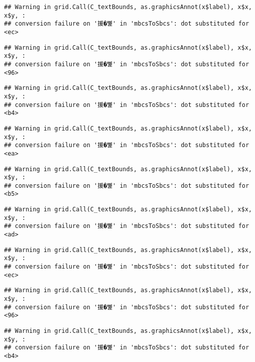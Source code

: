 \documentclass[
]{article}
\begin{document}
\begin{verbatim}
## Warning in grid.Call(C_textBounds, as.graphicsAnnot(x$label), x$x, x$y, :
## conversion failure on '援�뼱' in 'mbcsToSbcs': dot substituted for <ec>
\end{verbatim}

\begin{verbatim}
## Warning in grid.Call(C_textBounds, as.graphicsAnnot(x$label), x$x, x$y, :
## conversion failure on '援�뼱' in 'mbcsToSbcs': dot substituted for <96>
\end{verbatim}

\begin{verbatim}
## Warning in grid.Call(C_textBounds, as.graphicsAnnot(x$label), x$x, x$y, :
## conversion failure on '援�뼱' in 'mbcsToSbcs': dot substituted for <b4>
\end{verbatim}

\begin{verbatim}
## Warning in grid.Call(C_textBounds, as.graphicsAnnot(x$label), x$x, x$y, :
## conversion failure on '援�뼱' in 'mbcsToSbcs': dot substituted for <ea>
\end{verbatim}

\begin{verbatim}
## Warning in grid.Call(C_textBounds, as.graphicsAnnot(x$label), x$x, x$y, :
## conversion failure on '援�뼱' in 'mbcsToSbcs': dot substituted for <b5>
\end{verbatim}

\begin{verbatim}
## Warning in grid.Call(C_textBounds, as.graphicsAnnot(x$label), x$x, x$y, :
## conversion failure on '援�뼱' in 'mbcsToSbcs': dot substituted for <ad>
\end{verbatim}

\begin{verbatim}
## Warning in grid.Call(C_textBounds, as.graphicsAnnot(x$label), x$x, x$y, :
## conversion failure on '援�뼱' in 'mbcsToSbcs': dot substituted for <ec>
\end{verbatim}

\begin{verbatim}
## Warning in grid.Call(C_textBounds, as.graphicsAnnot(x$label), x$x, x$y, :
## conversion failure on '援�뼱' in 'mbcsToSbcs': dot substituted for <96>
\end{verbatim}

\begin{verbatim}
## Warning in grid.Call(C_textBounds, as.graphicsAnnot(x$label), x$x, x$y, :
## conversion failure on '援�뼱' in 'mbcsToSbcs': dot substituted for <b4>
\end{verbatim}
\end{document}
